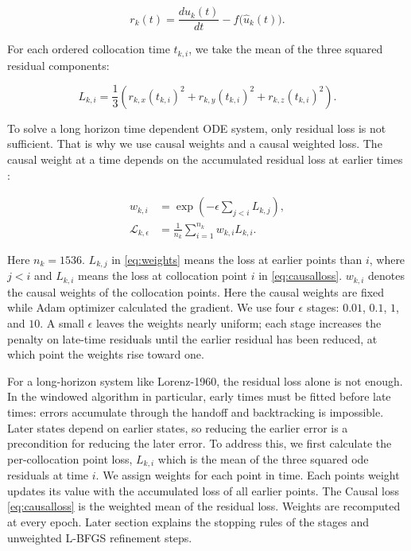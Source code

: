 \documentclass[conference]{IEEEtran}
\begin{document}
\begin{equation}
r_k(t)
  = \frac{d\hat{u}_k(t)}{dt} - f\bigl(\hat{u}_k(t)\bigr).
\label{eq:residual}
\end{equation}

For each ordered collocation time $t_{k,i}$, we take the mean of the three squared residual components:

\begin{equation}
L_{k,i}
  = \frac{1}{3}\left(
      r_{k,x}(t_{k,i})^2+
      r_{k,y}(t_{k,i})^2+
      r_{k,z}(t_{k,i})^2
    \right).
\label{eq:pointloss}
\end{equation}

To solve a long horizon time dependent ODE system, only residual loss is not sufficient. That is why we use causal weights and a causal weighted loss. The causal weight at a time depends on the accumulated residual loss at earlier times \cite{wang2024causal}:

\begin{align}
w_{k,i}
  &= \exp\left(-\epsilon\sum_{j<i}L_{k,j}\right),
     \label{eq:weights}\\
\mathcal{L}_{k,\epsilon}
  &= \frac{1}{n_k}\sum_{i=1}^{n_k}w_{k,i}L_{k,i}.
     \label{eq:causalloss}
\end{align}

Here $n_k=1536$. $L_{k,j}$ in \eqref{eq:weights} means the loss at earlier points than $i$, where $j < i$ and $L_{k,i}$ means the loss at collocation point $i$ in \eqref{eq:causalloss}. $w_{k,i}$ denotes the causal weights of the collocation points. Here the causal weights are fixed while Adam optimizer calculated the gradient. We use four $\epsilon$ stages: $0.01$, $0.1$, $1$, and $10$. A small $\epsilon$ leaves the weights nearly uniform; each stage increases the penalty on late-time residuals until the earlier residual has been reduced, at which point the weights rise toward one.

For a long-horizon system like Lorenz-1960, the residual loss alone is not enough. In the windowed algorithm in particular, early times must be fitted before late times: errors accumulate through the handoff and backtracking is impossible. Later states depend on earlier states, so reducing the earlier error is a precondition for reducing the later error. To address this, we first calculate the per-collocation point loss, $L_{k,i}$ which is the mean of the three squared ode residuals at time $i$. We assign weights for each point in time. Each points weight updates its value with the accumulated loss of all earlier points. The Causal loss \eqref{eq:causalloss} is the weighted mean of the residual loss. Weights are recomputed at every epoch. Later section explains the stopping rules of the stages and unweighted L-BFGS refinement steps. 
\end{document}
